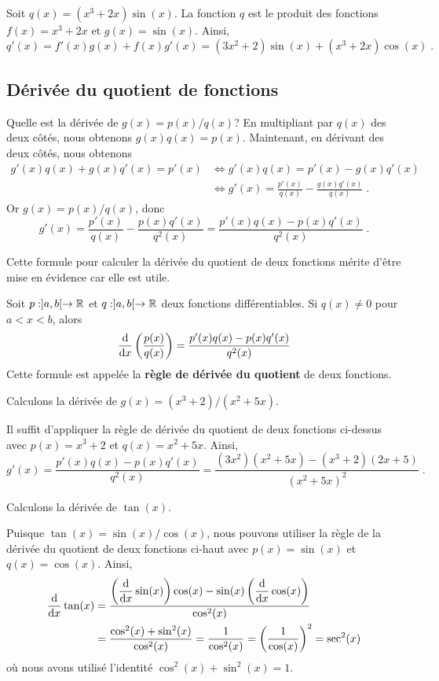 {\begin{egg}
Soit $q(x) = (x^3+2x)\sin(x)$.  La fonction $q$ est le produit des
fonctions $f(x) = x^3+2x$ et $g(x) = \sin(x)$.  Ainsi,
\[
q'(x) = f'(x) g(x) + f(x) g'(x) = (3x^2 +2)\sin(x) + (x^3+2x)\cos(x)
\; .
\]
\end{egg}

\subsection{Dérivée du quotient de fonctions}

Quelle est la dérivée de $g(x) = p(x) / q(x)$?  En multipliant par
$q(x)$ des deux côtés, nous obtenons $g(x) q(x) = p(x)$.  Maintenant, en
dérivant des deux côtés, nous obtenons
\begin{align*}
g'(x) q(x) + g(x) q'(x) = p'(x)
&\Leftrightarrow g'(x) q(x) = p'(x) - g(x) q'(x) \\
&\Leftrightarrow g'(x) = \frac{p'(x)}{q(x)} - \frac{g(x) q'(x)}{q(x)} \; .
\end{align*}
Or $g(x) = p(x) / q(x)$, donc
\[
g'(x) = \frac{p'(x)}{q(x)} - \frac{p(x) q'(x)}{q^2(x)}
= \frac{p'(x) q(x) - p(x) q'(x)}{q^2(x)} \; .
\]

Cette formule pour calculer la dérivée du quotient de deux fonctions
mérite d'être mise en évidence car elle est utile.

\begin{focus}{\prp} 
Soit $p:]a,b[\to \RR$ et $q:]a,b[\to \RR$ deux fonctions
différentiables.  Si $q(x) \neq 0$ pour $a<x<b$, alors
\[
\dfdx{\left(\frac{p(x)}{q(x)}\right)}{x}
= \frac{p'(x) q(x) - p(x) q'(x)}{q^2(x)}
\]
Cette formule est appelée la {\bfseries règle de dérivée du
quotient} de deux fonctions.
\end{focus}

\begin{egg}
Calculons la dérivée de $g(x) = (x^3+2)/(x^2+5x)$.

Il suffit d'appliquer la règle de dérivée du quotient de deux
fonctions ci-dessus avec $p(x) = x^3+2$ et $q(x) = x^2+5x$.  Ainsi,
\[
g'(x) = \frac{p'(x) q(x) - p(x) q'(x)}{q^2(x)}
= \frac{(3x^2)(x^2+5x) - (x^3+2)(2x+5)}{(x^2+5x)^2} \; .
\]
\end{egg}

\begin{egg}
Calculons la dérivée de $\tan(x)$.

Puisque $\tan(x) = \sin(x) / \cos(x)$, nous pouvons utiliser la règle de la
dérivée du quotient de deux fonctions ci-haut avec
$p(x) = \sin(x)$ et $q(x) = \cos(x)$.  Ainsi,
\begin{align*}
\dfdx{\tan(x)}{x} &= \frac{\left(\displaystyle \dfdx{\sin(x)}{x}\right) \cos(x)
- \sin(x) \left(\displaystyle \dfdx{\cos(x)}{x}\right)}{\cos^2(x)} \\
&= \frac{ \cos^2(x) + \sin^2(x)}{\cos^2(x)}
= \frac{1}{\cos^2(x)}
= \left(\frac{1}{\cos(x)}\right)^2 = \sec^2(x)
\end{align*}
où nous avons utilisé l'identité $\cos^2(x) + \sin^2(x) = 1$.
\end{egg}

}
